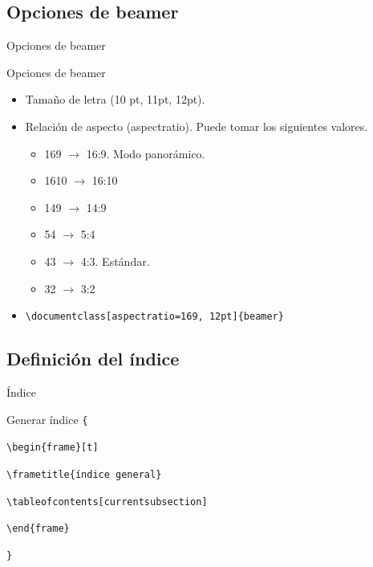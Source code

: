 \documentclass[aspectratio=169, 10pt]{beamer}
\begin{document}
\subsection{Opciones de beamer}
\begin{frame}[fragile]{Opciones de beamer}
\begin{block}{Opciones de beamer} \pause
    \begin{itemize}
        \item Tamaño de letra (10 pt, 11pt, 12pt). \pause
        \item Relación de aspecto (aspectratio). Puede tomar los siguientes valores. \pause
        \begin{itemize}
            \item 169 $ \to $ 16:9. Modo panorámico. \pause
            \item 1610 $ \to $ 16:10 \pause
            \item 149 $\to $ 14:9 \pause
            \item 54 $\to$ 5:4 \pause
            \item 43 $\to $ 4:3. Estándar. \pause
            \item 32 $ \to $ 3:2
        \end{itemize} \pause
        \item \verb|\documentclass[aspectratio=169, 12pt]{beamer}|
    \end{itemize}
\end{block}
    
\end{frame}

\subsection{Definición del índice}
\begin{frame}[fragile]{Índice} 
    \begin{block}{Generar índice} \pause
        \verb|{| \pause
        
        \verb|\begin{frame}[t]| \pause
        
        \verb|\frametitle{índice general}| \pause
        
            \verb|\tableofcontents[currentsubsection]| \pause
        
        \verb|\end{frame}|    \pause
        
        \verb|}| 
        
    \end{block}
\end{frame}
\end{document}
